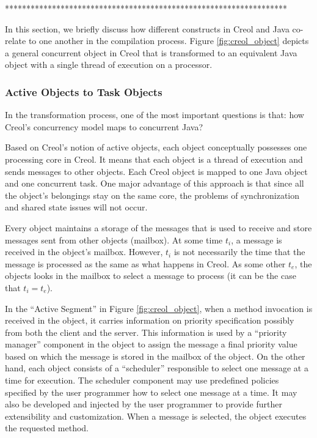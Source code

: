 ******************************************************************

In this section, we briefly discuss how different constructs in Creol and Java
co-relate to one another in the compilation process.
Figure \ref{fig:creol_object} depicts a general concurrent object in Creol that is transformed 
to an equivalent Java object with a single thread of execution on a processor.

\subsubsection{Active Objects to Task Objects}
In the transformation process, one of the most important questions is that: how
Creol's concurrency model maps to concurrent Java?

Based on Creol's notion of active objects, each object conceptually possesses
one processing core in Creol. It means that each object is a thread of execution
and sends messages to other objects. Each Creol object is mapped to one Java
object and one concurrent task. One major advantage of this approach is that
since all the object's belongings stay on the same core, the problems of
synchronization and shared state issues will not occur.

Every object maintains a storage of the messages that is used to receive and
store messages sent from other objects (mailbox). At some time $t_i$, a message
is received in the object's mailbox. However, $t_i$ is not necessarily the time
that the message is processed as the same as what happens in Creol. As some
other $t_e$, the objects looks in the mailbox to select a message to process (it
can be the case that $t_i = t_e$). 

In the ``Active Segment'' in Figure \ref{fig:creol_object}, when a method
invocation is received in the object, it carries information on priority
specification possibly from both the client and the server. This information is
used by a ``priority manager'' component in the object to assign the message a
final priority value based on which the message is stored in the mailbox of the object.
On the other hand, each object consists of a ``scheduler'' responsible to select
one message at a time for execution. The scheduler component may use predefined
policies specified by the user programmer how to select one message at a time.
It may also be developed and injected by the user programmer to provide further
extensibility and customization. When a message is selected, the object executes
the requested method.

